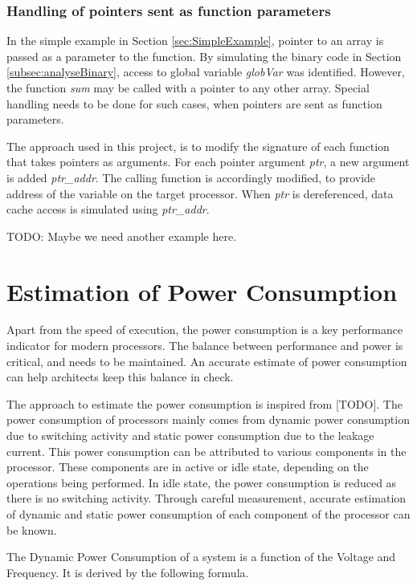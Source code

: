 \subsubsection{Handling of pointers sent as function parameters}

In the simple example in Section \ref{sec:SimpleExample}, pointer to an array is passed as a parameter to the function. By simulating the binary code in Section \ref{subsec:analyseBinary}, access to global variable \emph{globVar} was identified. However, the function \emph{sum} may be called with a pointer to any other array. Special handling needs to be done for such cases, when pointers are sent as function parameters.

The approach used in this project, is to modify the signature of each function that takes pointers as arguments. For each pointer argument \emph{ptr}, a new argument is added \emph{ptr\_addr}. The calling function is accordingly modified, to provide address of the variable on the target processor. When \emph{ptr} is dereferenced, data cache access is simulated using \emph{ptr\_addr}. 

TODO: Maybe we need another example here.

\section{Estimation of Power Consumption}
Apart from the speed of execution, the power consumption is a key performance indicator for modern processors. The balance between performance and power is critical, and needs to be maintained. An accurate estimate of power consumption can help architects keep this balance in check.

The approach to estimate the power consumption is inspired from [TODO]. The power consumption of processors mainly comes from dynamic power consumption due to switching activity and static power consumption due to the leakage current. This power consumption can be attributed to various components in the processor. These components are in active or idle state, depending on the operations being performed. In idle state, the power consumption is reduced as there is no switching activity. Through careful measurement, accurate estimation of dynamic and static power consumption of each component of the processor can be known.

The Dynamic Power Consumption of a system is a function of the Voltage and Frequency. It is derived by the following formula.

